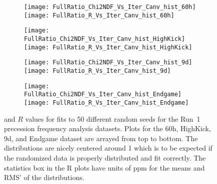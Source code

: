 \begin{figure}
\centering
    \vspace{-3mm}
    \begin{subfigure}[]{1\textwidth}
        \centering
        \texttt{[image: FullRatio\_Chi2NDF\_Vs\_Iter\_Canv\_hist\_60h]}
        \texttt{[image: FullRatio\_R\_Vs\_Iter\_Canv\_hist\_60h]}
    \end{subfigure}

    \vspace{-3mm}
    \begin{subfigure}[]{1\textwidth}
        \centering
        \texttt{[image: FullRatio\_Chi2NDF\_Vs\_Iter\_Canv\_hist\_HighKick]}
        \texttt{[image: FullRatio\_R\_Vs\_Iter\_Canv\_hist\_HighKick]}
    \end{subfigure}

    \vspace{-3mm}
    \begin{subfigure}[]{1\textwidth}
        \centering
        \texttt{[image: FullRatio\_Chi2NDF\_Vs\_Iter\_Canv\_hist\_9d]}
        \texttt{[image: FullRatio\_R\_Vs\_Iter\_Canv\_hist\_9d]}
    \end{subfigure}

    \vspace{-3mm}
    \begin{subfigure}[]{1\textwidth}
        \centering
        \texttt{[image: FullRatio\_Chi2NDF\_Vs\_Iter\_Canv\_hist\_Endgame]}
        \texttt{[image: FullRatio\_R\_Vs\_Iter\_Canv\_hist\_Endgame]}
    \end{subfigure}

\caption[\chisq's and $R$ values for fits to many random seeds]{\chisq and $R$ values for fits to 50 different random seeds for the Run~1 precession frequency analysis datasets. Plots for the 60h, HighKick, 9d, and Endgame dataset are arrayed from top to bottom. The \chisq distributions are nicely centered around 1 which is to be expected if the randomized data is properly distributed and fit correctly. The statistics box in the R plots have units of ppm for the means and RMS' of the distributions.}
\label{fig:randomSeedFits_chi2_and_R}
\end{figure}





